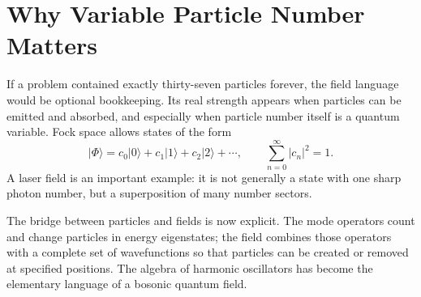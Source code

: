 \section{Why Variable Particle Number Matters}

If a problem contained exactly thirty-seven particles forever, the field language would be optional bookkeeping. Its real strength appears when particles can be emitted and absorbed, and especially when particle number itself is a quantum variable. Fock space allows states of the form
\begin{equation}
|\Phi\rangle
=c_0|0\rangle+c_1|1\rangle+c_2|2\rangle+\cdots,
\qquad
\sum_{n=0}^{\infty}|c_n|^2=1.
\end{equation}
A laser field is an important example: it is not generally a state with one sharp photon number, but a superposition of many number sectors.

The bridge between particles and fields is now explicit. The mode operators count and change particles in energy eigenstates; the field combines those operators with a complete set of wavefunctions so that particles can be created or removed at specified positions. The algebra of harmonic oscillators has become the elementary language of a bosonic quantum field.
